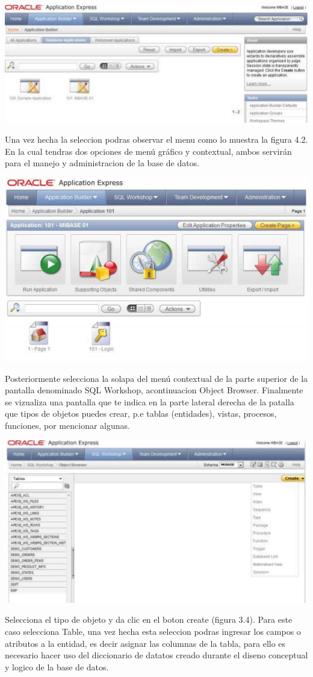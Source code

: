 \documentclass[12pt,letterpaper]{article}
\begin{document}
\begin{center}
\includegraphics[width=15cm]{./IMG/img14}
\end{center}
Una vez hecha la seleccion podras observar el menu como lo muestra la figura
4.2. En la cual tendras dos opciones de menú gráfico y contextual, ambos servirán
para el manejo y administracion de la base de datos.
\begin{center}
\includegraphics[width=15cm]{./IMG/img15}
\end{center}
Posteriormente selecciona la solapa del menú contextual de la parte superior de la
pantalla denominado SQL Workshop, acontinuacion Object Browser. Finalmente
se vizualiza una pantalla que te indica en la parte lateral derecha de la patalla que
tipos de objetos puedes crear, p.e tablas (entidades), vistas, procesos, funciones,
por mencionar algunas.
\begin{center}
\includegraphics[width=15cm]{./IMG/img16}
\end{center}
Selecciona el tipo de objeto y da clic en el boton create (figura 3.4). Para este
caso selecciona Table, una vez hecha esta seleccion podras ingresar los campos
o atributos a la entidad, es decir asignar las columnas de la tabla, para ello es
necesario hacer uso del diccionario de datatos creado durante el diseno conceptual
y logico de la base de datos. 
\end{document}
